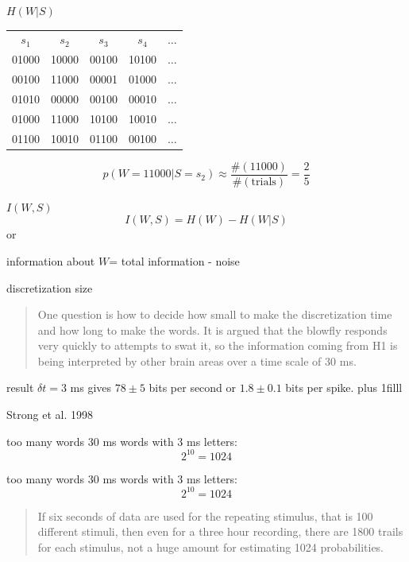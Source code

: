 \documentclass{beamer}
\newcommand{\btVFill}{\vskip0pt plus 1filll}
\newcommand{\crish}{\color{reddish}}
\newcommand{\cbla}{\color{black}}
\newcommand{\cblu}{\color{blue}}
\begin{document}
\begin{frame}{$H(W|S)$}
  \begin{tabular}{ccccc}
   $s_1$&$s_2$&$s_3$&$s_4$&$\ldots$\\  
   01000&\cblu{}10000\cbla{}&00100&10100&$\ldots$\\
   00100&\cblu{}11000\cbla{}&00001&01000&$\ldots$\\
   01010&\cblu{}00000\cbla{}&00100&00010&$\ldots$\\
   01000&\cblu{}11000\cbla{}&10100&10010&$\ldots$\\
   01100&\cblu{}10010\cbla{}&01100&00100&$\ldots$
  \end{tabular}
  \cblu
  $$
  p(W=11000|S=s_2)\approx\frac{\#(11000)}{\#(\mbox{trials})}=\frac{2}{5}
  $$
  \cbla
\end{frame}


\begin{frame}{$I(W,S)$}
  \crish
  $$I(W,S)=H(W)-H(W|S)$$
  \cbla
  or
  \begin{center}
    information about \crish$W$\cbla = total information - noise
  \end{center}
\end{frame}

\begin{frame}{discretization size}
  \begin{quote}
One question is how to decide how small to make the discretization time and how long to make the words. It is argued that the blowfly responds very quickly to attempts to swat it, so the information coming from H1 is being interpreted by other brain areas over a time scale of 30 ms.
  \end{quote}
\end{frame}


\begin{frame}{result}
\cblu $\delta t=3$ ms\cbla{} gives \cblu $78\pm 5$ bits per second \cbla or \cblu $1.8\pm 0.1$ bits per spike\cbla. 
\btVFill
\begin{flushright}
\tiny{Strong et al. 1998}
\end{flushright}
\end{frame}


\begin{frame}{too many words}
  30 ms words with 3 ms letters:
  \crish
  $$
  2^{10}=1024
  $$ \cbla
\end{frame}


\begin{frame}{too many words}
  30 ms words with 3 ms letters:
  \crish
  $$
  2^{10}=1024
  $$ \cbla
  \begin{quote}
  If six seconds of data are used for the repeating stimulus, that is 100 different stimuli, then even for a three hour recording, there are 1800 trails for each stimulus, not a huge amount for estimating 1024 probabilities.
  \end{quote}
\end{frame}
\end{document}
